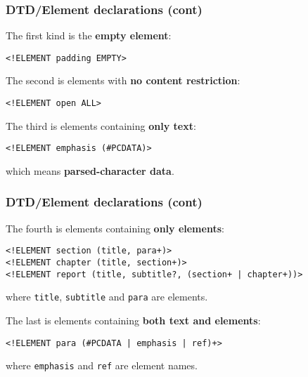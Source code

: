 %
\begin{frame}[containsverbatim]
\frametitle{DTD/Element declarations (cont)}

The first kind is the \textbf{empty element}:
\begin{verbatim}
<!ELEMENT padding EMPTY>
\end{verbatim}
The second is elements with \textbf{no content restriction}:
\begin{verbatim}
<!ELEMENT open ALL>
\end{verbatim}
The third is elements containing \textbf{only text}:
\begin{verbatim}
<!ELEMENT emphasis (#PCDATA)>
\end{verbatim}
which means \textbf{parsed-character data}.

\end{frame}

%
\begin{frame}[containsverbatim]
\frametitle{DTD/Element declarations (cont)}

The fourth is elements containing \textbf{only elements}:
{\small
\begin{verbatim}
<!ELEMENT section (title, para+)>
<!ELEMENT chapter (title, section+)>
<!ELEMENT report (title, subtitle?, (section+ | chapter+))>
\end{verbatim}
}
where \texttt{title}, \texttt{subtitle} and \texttt{para} are
elements.

\bigskip

The last is elements containing \textbf{both text and elements}:
{\small
\begin{verbatim}
<!ELEMENT para (#PCDATA | emphasis | ref)+>
\end{verbatim}
}
where \texttt{emphasis} and \texttt{ref} are element names.

\end{frame}

